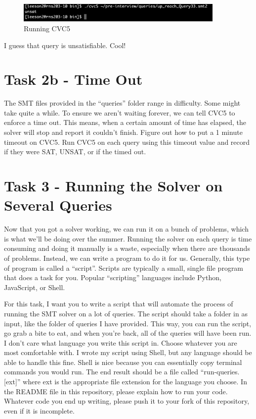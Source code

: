 \documentclass{article}
\begin{document}
\begin{figure}[!h]
    \centering
    \includegraphics[width=0.9\textwidth ]{imgs/CVC-Running.png}
    \caption{Running CVC5}\label{fig:CVC5-running}
\end{figure}

\noindent
I guess that query is unsatisfiable. Cool!

\section*{Task 2b - Time Out}
The SMT files provided in the ``queries'' folder range in difficulty. Some might take quite a while.
To ensure we aren't waiting forever, we can tell CVC5 to enforce a time out.
This means, when a certain amount of time has elapsed, the solver will stop and report it couldn't finish.
Figure out how to put a 1 minute timeout on CVC5.
Run CVC5 on each query using this timeout value and record if they were SAT, UNSAT, or if the timed out.

\section*{Task 3 - Running the Solver on Several Queries}
Now that you got a solver working, we can run it on a bunch of problems, which is what we'll be doing over the summer.
Running the solver on each query is time consuming and doing it manually is a waste, especially when there are thousands of problems.
Instead, we can write a program to do it for us.
Generally, this type of program is called a ``script''.
Scripts are typically a small, single file program that does a task for you.
Popular ``scripting'' languages include Python, JavaScript, or Shell.

For this task, I want you to write a script that will automate the process of running the SMT solver on a lot of queries.
The script should take a folder in as input, like the folder of queries I have provided.
This way, you can run the script, go grab a bite to eat, and when you're back, all of the queries will have been run.
I don't care what language you write this script in.
Choose whatever you are most comfortable with.
I wrote my script using Shell, but any language should be able to handle this fine.
Shell is nice because you can essentially copy terminal commands you would run.
The end result should be a file called ``run-queries.[ext]'' where ext is the appropriate file extension for the language you choose.
In the README file in this repository, please explain how to run your code.
Whatever code you end up writing, please push it to your fork of this repository, even if it is incomplete.
\end{document}
